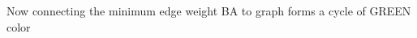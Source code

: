 \documentclass[preview]{standalone}
\begin{document}
\begin{center}
Now connecting the minimum edge weight BA to graph forms a cycle of GREEN color
\end{center}
\end{document}
